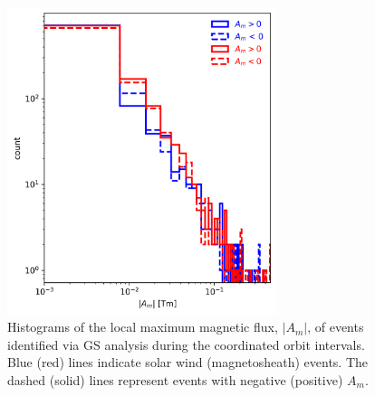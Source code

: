 \begin{figure}
    \centering
    \includegraphics[width=0.7\textwidth]{Figures/Histograms/Asplit_coordinated.png}
    \caption[Histogram of poloidal magnetic ﬂux per unit length from coordinated analysis]{Histograms of the local maximum magnetic flux, $|A_m|$, of events identified via GS analysis during the coordinated orbit intervals. Blue (red) lines indicate solar wind (magnetosheath) events. The dashed (solid) lines represent events with negative (positive) $A_m$.}
    \label{fig:histogram-Asplit-coordinated}
\end{figure}


